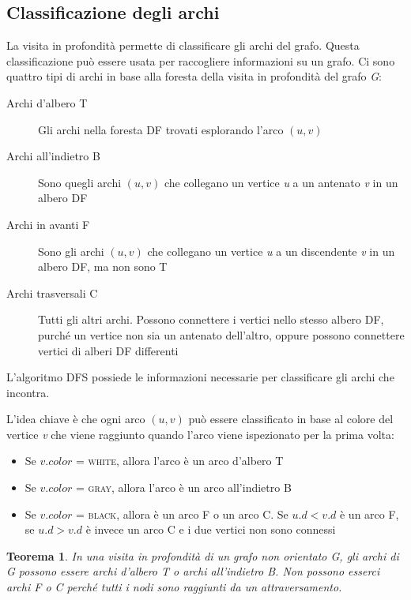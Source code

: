 \documentclass[10pt, a4paper]{report}
\newtheorem{theorem}{Teorema}[chapter]
\begin{document}
\subsection{Classificazione degli archi}
La visita in profondità permette di classificare gli archi del grafo. Questa classificazione può essere usata per raccogliere informazioni su un grafo. Ci sono quattro tipi di archi in base alla foresta della visita in profondità del grafo \textit{G}:
\begin{description}
\item[Archi d'albero T] Gli archi nella foresta DF trovati esplorando l'arco $(u,v)$
\item[Archi all'indietro B] Sono quegli archi $(u,v)$ che collegano un vertice \textit{u} a un antenato \textit{v} in un albero DF
\item[Archi in avanti F] Sono gli archi $(u,v)$ che collegano un vertice \textit{u} a un discendente \textit{v} in un albero DF, ma non sono T
\item[Archi trasversali C] Tutti gli altri archi. Possono connettere i vertici nello stesso albero DF, purché un vertice non sia un antenato dell'altro, oppure possono connettere vertici di alberi DF differenti
\end{description}
L'algoritmo \textsc{DFS} possiede le informazioni necessarie per classificare gli archi che incontra.

L'idea chiave è che ogni arco $(u,v)$ può essere classificato in base al colore del vertice \textit{v} che viene raggiunto quando l'arco viene ispezionato per la prima volta:
\begin{itemize}
\item Se $v.color$ = \textsc{white}, allora l'arco è un arco d'albero T
\item Se $v.color$ = \textsc{gray}, allora l'arco è un arco all'indietro B
\item Se $v.color$ = \textsc{black}, allora è un arco F o un arco C. Se $u.d < v.d$ è un arco F, se $u.d > v.d$ è invece un arco C e i due vertici non sono connessi
\end{itemize}
\begin{theorem}
In una visita in profondità di un grafo non orientato \textit{G}, gli archi di \textit{G} possono essere archi d'albero T o archi all'indietro B. Non possono esserci archi F o C perché tutti i nodi sono raggiunti da un attraversamento.
\end{theorem}
\end{document}
